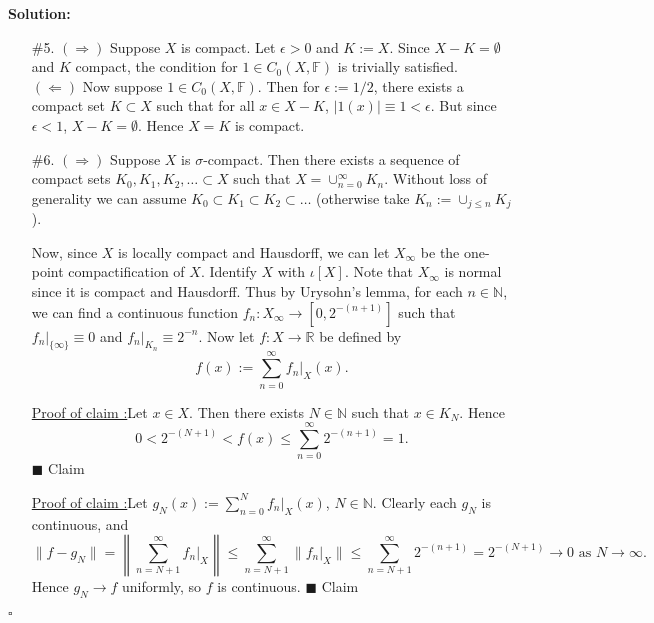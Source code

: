 \documentclass[12pt]{article}
\newcounter{ProofCounter}
\newcounter{ClaimCounter}[ProofCounter]
\newenvironment{Solution}{\stepcounter{ProofCounter}\textbf{Solution:}}{\hfill$\square$}
\newenvironment{claim}[1]{\vspace{1mm}\stepcounter{ClaimCounter}\par\noindent\underline{\bf Claim \theClaimCounter:}\space#1}{}
\newenvironment{claimproof}[1]{\par\noindent\underline{Proof of claim \theClaimCounter:}\space#1}{\hfill $\blacksquare$ Claim \theClaimCounter}
\begin{document}
\begin{Solution}
\begin{enumerate}
      \vspace{1cm}

    \item[\#5.] $(\Rightarrow)$ Suppose $X$ is compact. Let $\epsilon > 0$ and $K := X$. Since $X - K = \emptyset$ and $K$ compact, the condition for
      $1 \in C_0(X, \mathbb{F})$ is  trivially satisfied. \\

      $(\Leftarrow)$ Now suppose $1 \in C_0(X, \mathbb{F})$. Then for $\epsilon := 1/2$, there exists a compact set $K \subset X$ such that for all $x
      \in X - K$, $|1(x)| \equiv 1 < \epsilon$. But since $\epsilon < 1$, $X - K = \emptyset$. Hence $X = K$ is compact.

      \vspace{1cm}

    \item[\#6.] $(\Rightarrow)$ Suppose $X$ is $\sigma$-compact. Then there exists a sequence of compact sets $K_0, K_1, K_2, \dots \subset X$ such
      that $X = \cup_{n=0}^{\infty}K_n$. Without loss of generality we can assume $K_0 \subset K_1 \subset K_2 \subset \dots$ (otherwise take $K_n :=
      \cup_{j \leq n} K_j$). 
      
      Now, since $X$ is locally compact and Hausdorff, we can let $X_{\infty}$ be the one-point compactification of $X$. Identify $X$ with $\iota[X]$.
      Note that $X_{\infty}$ is
      normal since it is compact and Hausdorff. Thus by Urysohn's lemma, for each $n \in \mathbb{N}$, we can find a continuous function $f_{n} :
      X_{\infty} \rightarrow [0,2^{-(n+1)}]$ such that $f_{n}\big|_{\{\infty\}} \equiv 0$ and $f_{n}\big|_{K_n} \equiv 2^{-n}$. Now let $f : X \rightarrow
      \mathbb{R}$ be defined by 
      \[
        f(x) := \sum_{n=0}^{\infty} f_{n}\big|_{X}(x).
      \]
      \begin{claimproof}
        Let $x \in X$. Then there exists $N \in \mathbb{N}$ such that $x \in K_N$. Hence 
        \[
          0 < 2^{-(N+1)} < f(x) \leq \sum_{n=0}^{\infty}2^{-(n+1)} = 1.
        \]
      \end{claimproof}

      \begin{claimproof}
        Let $g_{N}(x) :=  \sum_{n=0}^{N}f_n\big|_{X}(x)$, $N \in \mathbb{N}$. Clearly each $g_N$ is continuous, and
        \[
          \big\| f - g_N \big\| = \left\|\sum_{n=N+1}^{\infty} f_n\big|_{X}\right\| \leq \sum_{n=N+1}^{\infty}\big\|f_n\big|_{X}\big\|
          \leq \sum_{n=N+1}^{\infty} 2^{-(n+1)} = 2^{-(N+1)} \rightarrow 0 \text{ as } N \rightarrow \infty.
        \]
        Hence $g_N \rightarrow f$ uniformly, so $f$ is continuous.
      \end{claimproof}


\end{enumerate}
\end{Solution}
\end{document}
